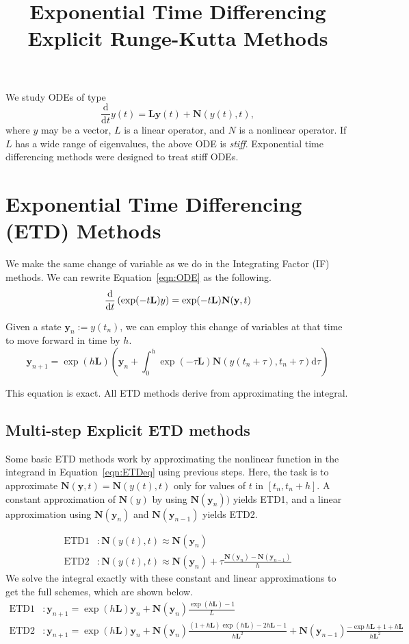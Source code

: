 \documentclass{article}
\title{Exponential Time Differencing Explicit Runge-Kutta Methods}
\newcommand{\bb}[1]{\mathbf{#1}}
\newcommand{\ddt}{\frac{\mathrm{d}}{\mathrm{d}t}}
\theoremstyle{definition}
\begin{document}
\maketitle
We study ODEs of type
\begin{equation}
	\ddt y(t) = \bb{Ly}(t) + \bb{N}(y(t),t),
	\label{eqn:ODE}
\end{equation}
where $y$ may be a vector, $L$ is a linear operator, and $N$ is a nonlinear operator. 
If $L$ has a wide range of eigenvalues, the above ODE is \emph{stiff}. 
Exponential time differencing methods were designed to treat stiff ODEs. 
\section{Exponential Time Differencing (ETD) Methods}
We make the same change of variable as we do in the Integrating Factor (IF) methods. 
We can rewrite Equation~\ref{eqn:ODE} as the following.
\begin{equation}
	\ddt\left(\exp(-t\bb{L}) y \right) = \exp(-t\bb{L})\bb{N}(\bb{y},t) \label{eqn:ETDcov}\\
\end{equation}

Given a state $\bb{y}_n:=y(t_n)$, we can employ this change of variables at that time to move forward in time by $h$. 
\begin{equation}
\bb{y}_{n+1}= \exp(h\bb{L})\left(\bb{y}_n + \int_{0}^{h} \exp(-\tau \bb{L}) \bb{N}(y(t_n+\tau), t_n+\tau) \mathrm{d}\tau \right)
\label{eqn:ETDeq}
\end{equation}

This equation is exact. 
All ETD methods derive from approximating the integral. 

\subsection{Multi-step Explicit ETD methods}
Some basic ETD methods work by approximating the nonlinear function in the integrand in Equation~\ref{eqn:ETDeq} using previous steps. 
Here, the task is to approximate $\bb{N}(\bb{y},t)=\bb{N}(y(t),t)$ only for values of $t$ in $[t_n, t_{n}+h]$. 
A constant approximation of $\bb{N}(y)$ by using $\bb{N}(\bb{y}_n))$ yields ETD1, and a linear approximation using $\bb{N}(\bb{y}_n)$ and $\bb{N}(\bb{y}_{n-1})$ yields ETD2.

\begin{align*}
\text{ETD1}&: \bb{N}(y(t),t) \approx \bb{N}(\bb{y}_n)\\
\text{ETD2}&: \bb{N}(y(t),t) \approx \bb{N}(\bb{y}_n) + \tau\frac{\bb{N}(\bb{y}_n)-\bb{N}(\bb{y}_{n-1})}{h}
\end{align*}
We solve the integral exactly with these constant and linear approximations to get the full schemes, which are shown below.
\begin{align*}
\text{ETD1}&: \bb{y}_{n+1} = \exp(h\bb{L})\bb{y}_n + \bb{N}(\bb{y}_n) \frac{\exp(h\bb{L})-1}{L}\\
\text{ETD2}&: \bb{y}_{n+1} = \exp(h\bb{L})\bb{y}_n + \bb{N}(\bb{y}_n) \frac{(1+h\bb{L})\exp(h\bb{L})-2h\bb{L}-1}{h\bb{L}^2} + \bb{N}(\bb{y}_{n-1})\frac{-\exp{h\bb{L}}+1+h\bb{L}}{h\bb{L}^2}
\end{align*}
\end{document}
